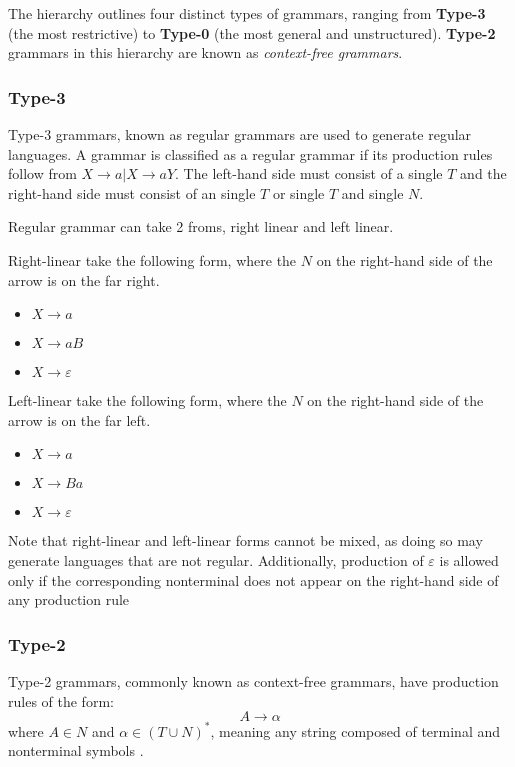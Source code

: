 The hierarchy outlines four distinct types of grammars, ranging from \textbf{Type-3} (the most restrictive) to \textbf{Type-0} (the most general and unstructured). \textbf{Type-2} grammars in this hierarchy are known as \emph{context-free grammars}.

\subsubsection{Type-3}
Type-3 grammars, known as regular grammars are used to generate regular languages. A grammar is classified as a regular grammar if its production rules follow from $X \rightarrow a | X \rightarrow aY$. The left-hand side must consist of a single $T$ and the right-hand side must consist of an single $T$ or single $T$ and single $N$.

Regular grammar can take 2 froms, right linear and left linear.

Right-linear take the following form, where the $N$ on the right-hand side of the arrow is on the far right.
\begin{itemize}
    \item[] $X \rightarrow a$
    \item[] $X \rightarrow aB$
    \item[] $X \rightarrow \varepsilon$
\end{itemize}

Left-linear take the following form, where the $N$ on the right-hand side of the arrow is on the far left.
\begin{itemize}
    \item[] $X \rightarrow a$
    \item[] $X \rightarrow Ba$
    \item[] $X \rightarrow \varepsilon$
\end{itemize}

Note that right-linear and left-linear forms cannot be mixed, 
as doing so may generate languages that are not regular. 
Additionally, production of $\varepsilon$ is allowed only if the corresponding nonterminal 
does not appear on the right-hand side of any production rule \cite{hendriksConsiderItParsed,shiIntelligenceScience2021}

\subsubsection{Type-2}

Type-2 grammars, commonly known as context-free grammars, have production rules of the form:
\[
A \rightarrow \alpha
\]
where \( A \in N \) and \( \alpha \in (T \cup N)^* \), meaning any string composed of terminal and nonterminal symbols \cite{hendriksConsiderItParsed,shiIntelligenceScience2021}.

